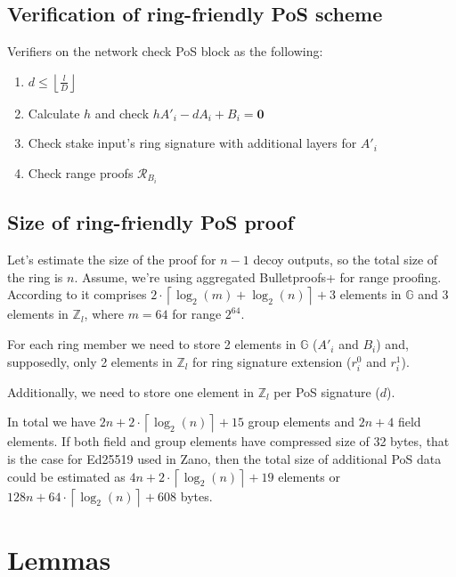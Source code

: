 \documentclass{article}
\newcommand{\floor}[1]{\left\lfloor #1 \right\rfloor}
\newcommand{\ceil}[1]{\left\lceil #1 \right\rceil}
\numberwithin{figure}{section}
\begin{document}
\subsection{Verification of ring-friendly PoS scheme}
Verifiers on the network check PoS block as the following:

\begin{enumerate}
    \item $d \leq \floor{\frac{l}{D}}$
    
    \item Calculate $h$ and check $h A'_i - d A_i + B_i = \mathbf{0}$
    
    \item Check stake input's ring signature with additional layers for $A'_i$
    
    \item Check range proofs $\mathcal{R}_B_i$
\end{enumerate}


\subsection{Size of ring-friendly PoS proof}

Let's estimate the size of the proof for $n-1$ decoy outputs, so the total size of the ring is $n$. Assume, we're using aggregated Bulletproofs+ for range proofing. According to \cite{BP+} it comprises $2 \cdot \ceil{\log_2(m) + \log_2(n)} + 3$ elements in $\mathbb{G}$ and 3 elements in $\mathbb{Z}_l$, where $m = 64$ for range $2^{64}$.

For each ring member we need to store 2 elements in $\mathbb{G}$ ($A'_i$ and $B_i$) and, supposedly, only 2 elements in $\mathbb{Z}_l$ for ring signature extension ($r^0_i$ and $r^1_i$).

Additionally, we need to store one element in $\mathbb{Z}_l$ per PoS signature ($d$).

In total we have $2n + 2 \cdot \ceil{\log_2(n)} + 15$ group elements and $2n + 4$ field elements. If both field and group elements have compressed size of 32 bytes, that is the case for Ed25519 used in Zano, then the total size of additional PoS data could be estimated as $4n + 2 \cdot \ceil{\log_2(n)} + 19$ elements or $128n + 64 \cdot \ceil{\log_2(n)} + 608$ bytes.

%
%
\printbibliography


\newpage
\appendix
\section{Lemmas}
\end{document}
